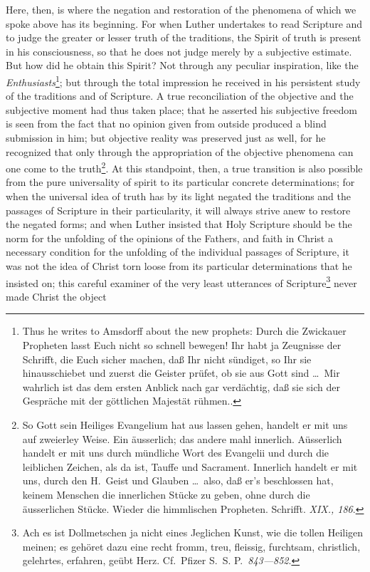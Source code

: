 \documentclass[12pt]{book}
\newcommand{\opage}[1]{\marginnote{\footnotesize\textit{[#1]}}}
\begin{document}
Here, then, is where the negation and restoration of the phenomena of which we
spoke above has its beginning. For when Luther undertakes to read Scripture
and to judge the greater or lesser truth of the traditions, the Spirit of
truth is present in his consciousness, so that he does not judge merely by a
subjective estimate. But how did he obtain this Spirit? Not through any
peculiar inspiration, like the \emph{Enthusiasts}\footnote{Thus he writes to
Amsdorff about the new prophets: Durch die Zwickauer Propheten lasst Euch nicht
so schnell bewegen! Ihr habt ja Zeugnisse der Schrifft, die Euch sicher
machen, daß Ihr nicht sündiget, so Ihr sie hinausschiebet und zuerst die
Geister prüfet, ob sie aus Gott sind \ldots\ Mir wahrlich ist das dem ersten
Anblick nach gar verdächtig, daß sie sich der Gespräche mit der göttlichen
Majestät rühmen..}; but through the total impression he received in his
persistent study of the traditions and of Scripture. A true reconciliation of
the objective and the subjective moment had thus taken place; that he asserted
his subjective freedom is seen from the fact that no opinion given from
outside produced a blind submission in him; but objective reality was
preserved just as well, for he recognized that only through the appropriation
\opage{67}\setcounter{footnote}{0}%
of the objective phenomena can one come to the truth\footnote{So Gott
sein Heiliges Evangelium hat aus lassen gehen, handelt er mit uns auf
zweierley Weise. Ein äusserlich; das andere mahl innerlich. Aüsserlich handelt
er mit uns durch mündliche Wort des Evangelii und durch die leiblichen
Zeichen, als da ist, Tauffe und Sacrament. Innerlich handelt er mit uns, durch
den H.~Geist und Glauben \ldots\ also, daß er's beschlossen hat, keinem
Menschen die innerlichen Stücke zu geben, ohne durch die äusserlichen Stücke.
Wieder die himmlischen Propheten. Schrifft. \textit{XIX., 186}.}. At this
standpoint, then, a true transition is also possible from the pure
universality of spirit to its particular concrete determinations; for when
the universal idea of truth has by its light negated the traditions and the
passages of Scripture in their particularity, it will always strive anew to
restore the negated forms; and when Luther insisted that Holy Scripture
should be the norm for the unfolding of the opinions of the Fathers, and
faith in Christ a necessary condition for the unfolding of the individual
passages of Scripture, it was not the idea of Christ torn loose from its
particular determinations that he insisted on; this careful examiner of the
very least utterances of Scripture\footnote{Ach es ist Dollmetschen ja nicht
eines Jeglichen Kunst, wie die tollen Heiligen meinen; es gehöret dazu eine
recht fromm, treu, fleissig, furchtsam, christlich, gelehrtes, erfahren, geübt
Herz. Cf.\ Pfizer S.~S. P.~\textit{843---852}.} never made Christ the object
\end{document}
